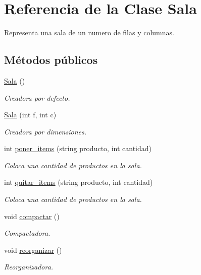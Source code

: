 \hypertarget{class_sala}{}\section{Referencia de la Clase Sala}
\label{class_sala}


Representa una sala de un numero de filas y columnas.  


\subsection*{Métodos públicos}
\begin{DoxyCompactItemize}
\item 
\hyperlink{class_sala_afcf1b7b533e776b043ce8fb13c6268ca}{Sala} ()
\begin{DoxyCompactList}\small\item\em Creadora por defecto. \end{DoxyCompactList}\item 
\hyperlink{class_sala_a9dd46530cc9e29341f692ee127fa5753}{Sala} (int f, int c)
\begin{DoxyCompactList}\small\item\em Creadora por dimensiones. \end{DoxyCompactList}\item 
int \hyperlink{class_sala_a744e44e1d14431a9589396a21983795e}{poner\+\_\+items} (string producto, int cantidad)
\begin{DoxyCompactList}\small\item\em Coloca una cantidad de productos en la sala. \end{DoxyCompactList}\item 
int \hyperlink{class_sala_aacda981f2c12c9d7f815f6933982ca2f}{quitar\+\_\+items} (string producto, int cantidad)
\begin{DoxyCompactList}\small\item\em Coloca una cantidad de productos en la sala. \end{DoxyCompactList}\item 
void \hyperlink{class_sala_aac11486a22560bdcdb7771e9692cfa75}{compactar} ()
\begin{DoxyCompactList}\small\item\em Compactadora. \end{DoxyCompactList}\item 
void \hyperlink{class_sala_aaac8d848595b493ea08516f2101b829e}{reorganizar} ()
\begin{DoxyCompactList}\small\item\em Reorganizadora. \end{DoxyCompactList}\item 

\end{DoxyCompactItemize}
